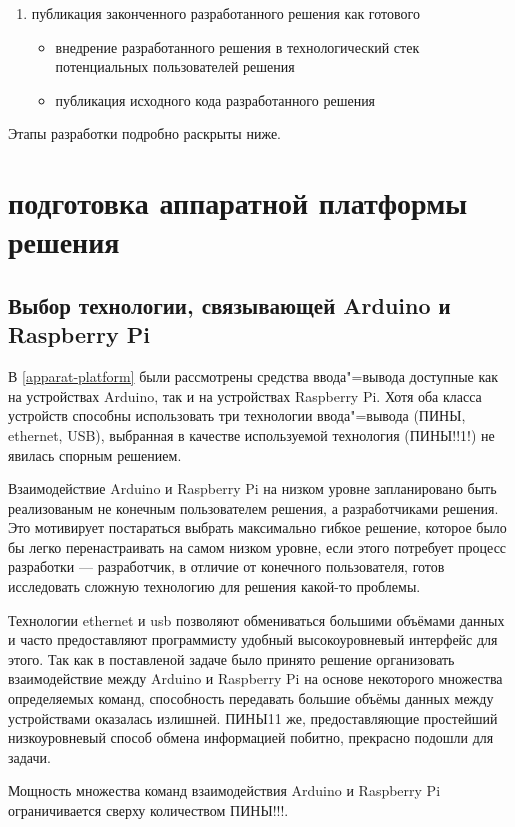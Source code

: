 \begin{enumerate}
\item публикация законченного разработанного решения как готового
\begin{itemize}
    \item внедрение разработанного решения в технологический стек потенциальных пользователей решения
    \item публикация исходного кода разработанного решения
\end{itemize}
\end{enumerate}

Этапы разработки подробно раскрыты ниже.

\section{подготовка аппаратной платформы решения}
\subsection{Выбор технологии, связывающей Arduino и Raspberry Pi}
В \ref{apparat-platform} были рассмотрены средства ввода"=вывода доступные как на устройствах Arduino, так и на устройствах Raspberry Pi.
Хотя оба класса устройств способны использовать три технологии ввода"=вывода (ПИНЫ, ethernet, USB), выбранная в качестве используемой технология (ПИНЫ!!1!) не явилась спорным решением.

Взаимодействие Arduino и Raspberry Pi на низком уровне запланировано быть реализованым не конечным пользователем решения, а разработчиками решения. Это мотивирует постараться выбрать максимально гибкое решение, которое было бы легко перенастраивать на самом низком уровне, если этого потребует процесс разработки --- разработчик, в отличие от конечного пользователя, готов исследовать сложную технологию для решения какой-то проблемы. 

Технологии ethernet и usb позволяют обмениваться большими объёмами данных и часто предоставляют программисту удобный высокоуровневый интерфейс для этого. Так как в поставленой задаче было принято решение организовать взаимодействие между Arduino и Raspberry Pi на основе некоторого множества определяемых команд, способность передавать большие объёмы данных между устройствами оказалась излишней. ПИНЫ11 же, предоставляющие простейший низкоуровневый способ обмена информацией побитно, прекрасно подошли для задачи.

Мощность множества команд взаимодействия Arduino и Raspberry Pi ограничивается сверху количеством ПИНЫ!!!.

